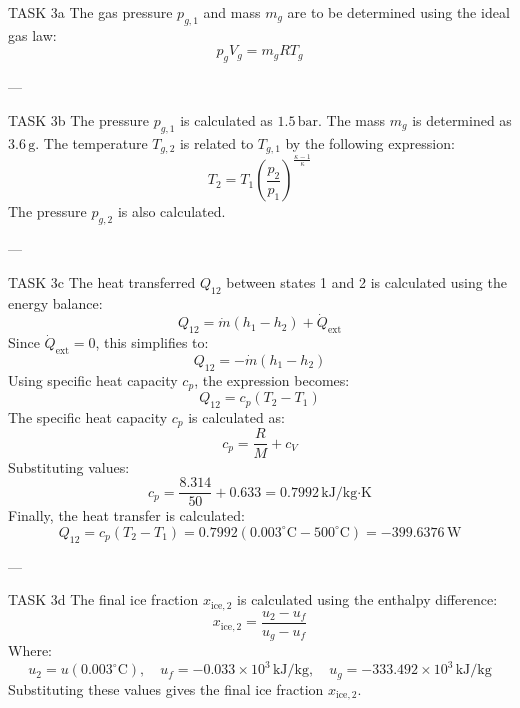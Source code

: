TASK 3a  
The gas pressure \( p_{g,1} \) and mass \( m_g \) are to be determined using the ideal gas law:  
\[
p_g V_g = m_g R T_g
\]

---

TASK 3b  
The pressure \( p_{g,1} \) is calculated as \( 1.5 \, \text{bar} \). The mass \( m_g \) is determined as \( 3.6 \, \text{g} \). The temperature \( T_{g,2} \) is related to \( T_{g,1} \) by the following expression:  
\[
T_2 = T_1 \left( \frac{p_2}{p_1} \right)^{\frac{\kappa - 1}{\kappa}}
\]  
The pressure \( p_{g,2} \) is also calculated.

---

TASK 3c  
The heat transferred \( Q_{12} \) between states 1 and 2 is calculated using the energy balance:  
\[
Q_{12} = \dot{m} (h_1 - h_2) + \dot{Q}_{\text{ext}}
\]  
Since \( \dot{Q}_{\text{ext}} = 0 \), this simplifies to:  
\[
Q_{12} = -\dot{m} (h_1 - h_2)
\]  
Using specific heat capacity \( c_p \), the expression becomes:  
\[
Q_{12} = c_p (T_2 - T_1)
\]  
The specific heat capacity \( c_p \) is calculated as:  
\[
c_p = \frac{R}{M} + c_V
\]  
Substituting values:  
\[
c_p = \frac{8.314}{50} + 0.633 = 0.7992 \, \text{kJ/kg·K}
\]  
Finally, the heat transfer is calculated:  
\[
Q_{12} = c_p (T_2 - T_1) = 0.7992 (0.003^\circ\text{C} - 500^\circ\text{C}) = -399.6376 \, \text{W}
\]

---

TASK 3d  
The final ice fraction \( x_{\text{ice},2} \) is calculated using the enthalpy difference:  
\[
x_{\text{ice},2} = \frac{u_2 - u_f}{u_g - u_f}
\]  
Where:  
\[
u_2 = u(0.003^\circ\text{C}), \quad u_f = -0.033 \times 10^3 \, \text{kJ/kg}, \quad u_g = -333.492 \times 10^3 \, \text{kJ/kg}
\]  
Substituting these values gives the final ice fraction \( x_{\text{ice},2} \).